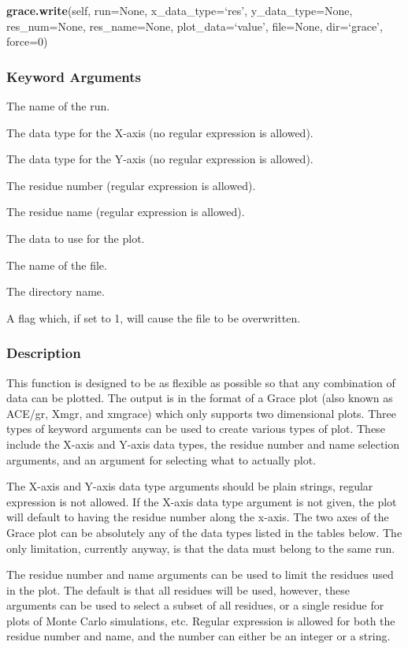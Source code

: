 \textsf{\textbf{grace.write}(self, run=None, x\_data\_type=`res', y\_data\_type=None, res\_num=None, res\_name=None, plot\_data=`value', file=None, dir=`grace', force=0)}


\subsubsection{Keyword Arguments}


  The name of the run.

  The data type for the X-axis (no regular expression is allowed).

  The data type for the Y-axis (no regular expression is allowed).

  The residue number (regular expression is allowed).

  The residue name (regular expression is allowed).

  The data to use for the plot.

  The name of the file.

  The directory name.

  A flag which, if set to 1, will cause the file to be overwritten.

\subsubsection{Description}

This function is designed to be as flexible as possible so that any combination of data can
be plotted.  The output is in the format of a Grace plot (also known as ACE/gr, Xmgr, and
xmgrace) which only supports two dimensional plots.  Three types of keyword arguments can
be used to create various types of plot.  These include the X-axis and Y-axis data types,
the residue number and name selection arguments, and an argument for selecting what to
actually plot.

The X-axis and Y-axis data type arguments should be plain strings, regular expression is not
allowed.  If the X-axis data type argument is not given, the plot will default to having the
residue number along the x-axis.  The two axes of the Grace plot can be absolutely any of
the data types listed in the tables below.  The only limitation, currently anyway, is that
the data must belong to the same run.

The residue number and name arguments can be used to limit the residues used in the plot.
The default is that all residues will be used, however, these arguments can be used to
select a subset of all residues, or a single residue for plots of Monte Carlo simulations,
etc.  Regular expression is allowed for both the residue number and name, and the number can
either be an integer or a string.

